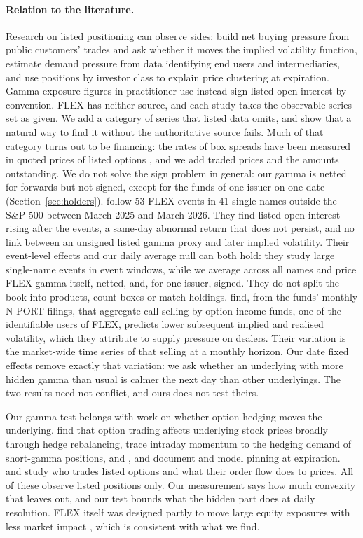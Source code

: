 \documentclass[11pt]{article}
\begin{document}
\paragraph{Relation to the literature.} Research on listed positioning can observe sides:
\citet{bollen2004} build net buying pressure from public customers' trades and ask whether
it moves the implied volatility function, \citet{garleanu2009} estimate demand pressure
from data identifying end users and intermediaries, and \citet{ni2005} use positions by
investor class to explain price clustering at expiration. Gamma-exposure figures in
practitioner use instead sign listed open interest by convention. FLEX has neither
source, and each study takes the observable series set as given. We add a category of series that listed data omits, and
show that a natural way to find it without the authoritative source fails. Much of that
category turns out to be financing: the rates of box spreads have been measured in quoted
prices of listed options \citep{binsbergen2022,kozlowski2025}, and we add traded prices
and the amounts outstanding. We do not
solve the sign problem in general: our gamma is netted for forwards but not signed,
except for the funds of one issuer on one date (Section~\ref{sec:holders}).
\citet{prakash2026} follow 53 FLEX events in 41 single names outside the S\&P 500
between March 2025 and March 2026. They find listed open interest rising
after the events, a same-day abnormal return that does not persist, and no link between
an unsigned listed gamma proxy and later implied volatility. Their event-level effects and
our daily average null can both hold: they study large single-name events in event
windows, while we average across all names and price FLEX gamma itself, netted, and, for
one issuer, signed. They do not split the book into products, count boxes or match
holdings.
\citet{park2025} find, from the funds' monthly N-PORT filings, that aggregate call selling
by option-income funds, one of the identifiable users of FLEX, predicts lower
subsequent implied and realised volatility, which they attribute to supply pressure on
dealers. Their variation is the market-wide time series of that selling at a monthly
horizon. Our date fixed effects remove exactly that variation: we ask whether an
underlying with more hidden gamma than usual is calmer the next day than other
underlyings. The two results need not conflict, and ours does not test theirs.

Our gamma test belongs with work on whether option hedging moves the underlying.
\citet{ni2021} find that option trading affects underlying stock prices broadly through
hedge rebalancing, \citet{baltussen2021} trace intraday momentum to the hedging demand of
short-gamma positions, and \citet{ni2005}, \citet{avellaneda2003} and \citet{golez2012}
document and model pinning at expiration. \citet{lakonishok2007} and \citet{muravyev2016}
study who trades listed options and what their order flow does to prices. All of these
observe listed positions only. Our measurement says how much convexity that leaves out,
and our test bounds what the hidden part does at daily resolution. FLEX itself was
designed partly to move large equity exposures with less market impact
\citep{angel1997}, which is consistent with what we find.
\end{document}
